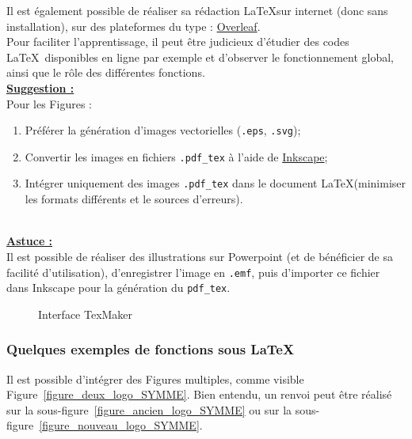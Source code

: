 \documentclass[a4paper,12pt]{report}
\begin{document}
Il est également possible de réaliser sa rédaction \LaTeX sur internet (donc sans installation), sur des plateformes du type : \href{https://www.overleaf.com/}{Overleaf}. \\

Pour faciliter l'apprentissage, il peut être judicieux d'étudier des codes \LaTeX~disponibles en ligne par exemple et d'observer le fonctionnement global, ainsi que le rôle des différentes fonctions.\\

\underline{\textbf{Suggestion :}} \\
Pour les Figures :
\begin{enumerate}
\item Préférer la génération d'images vectorielles (\verb|.eps|, \verb|.svg|);
\item Convertir les images en fichiers \verb|.pdf_tex| à l'aide de \href{https://inkscape.org/fr/}{Inkscape};
\item Intégrer uniquement des images \verb|.pdf_tex| dans le document \LaTeX (minimiser les formats différents et le sources d'erreurs).
\end{enumerate}

\ \\

\underline{\textbf{Astuce :}} \\
Il est possible de réaliser des illustrations sur Powerpoint (et de bénéficier de sa facilité d'utilisation), d'enregistrer l'image en \verb|.emf|, puis d'importer ce fichier dans Inkscape pour la génération du \verb|pdf_tex|.

\begin{figure}[hbtp]
	\centering
	\def\svgwidth{1\columnwidth}
	\fontsize{10pt}{10pt}\selectfont
	\caption{Interface TexMaker}
	\label{figure_tekmaker}
\end{figure}



\FloatBarrier
\subsubsection{Quelques exemples de fonctions sous \LaTeX}

Il est possible d'intégrer des Figures multiples, comme visible Figure~\ref{figure_deux_logo_SYMME}. Bien entendu, un renvoi peut être réalisé sur la sous-figure~\ref{figure_ancien_logo_SYMME} ou sur la sous-figure~\ref{figure_nouveau_logo_SYMME}. \\
\end{document}

